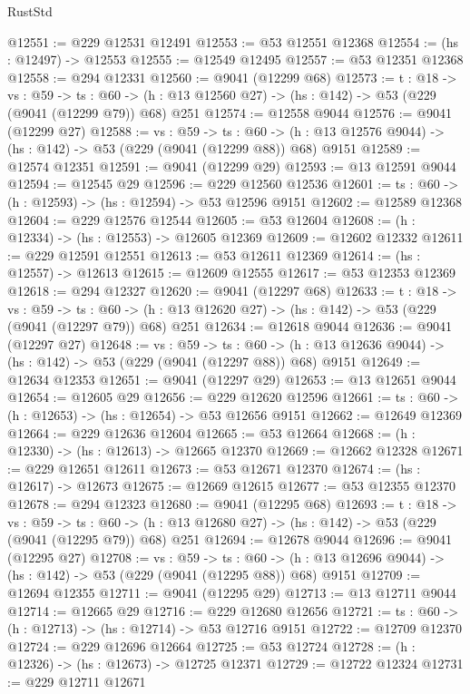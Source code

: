 \begin{lexlean}{RustStd}
\begin{coremodule}
@12551 := @229 @12531 @12491
@12553 := @53 @12551 @12368
@12554 := (hs : @12497) -> @12553
@12555 := @12549 @12495
@12557 := @53 @12351 @12368
@12558 := @294 @12331
@12560 := @9041 (@12299 @68)
@12573 := {t : @18} ->
  {vs : @59} ->
  {ts : @60} -> (h : @13 @12560 @27) -> (hs : @142) -> @53 (@229 (@9041 (@12299 @79)) @68) @251
@12574 := @12558 @9044
@12576 := @9041 (@12299 @27)
@12588 := {vs : @59} ->
  {ts : @60} -> (h : @13 @12576 @9044) -> (hs : @142) -> @53 (@229 (@9041 (@12299 @88)) @68) @9151
@12589 := @12574 @12351
@12591 := @9041 (@12299 @29)
@12593 := @13 @12591 @9044
@12594 := @12545 @29
@12596 := @229 @12560 @12536
@12601 := {ts : @60} -> (h : @12593) -> (hs : @12594) -> @53 @12596 @9151
@12602 := @12589 @12368
@12604 := @229 @12576 @12544
@12605 := @53 @12604
@12608 := (h : @12334) -> (hs : @12553) -> @12605 @12369
@12609 := @12602 @12332
@12611 := @229 @12591 @12551
@12613 := @53 @12611 @12369
@12614 := (hs : @12557) -> @12613
@12615 := @12609 @12555
@12617 := @53 @12353 @12369
@12618 := @294 @12327
@12620 := @9041 (@12297 @68)
@12633 := {t : @18} ->
  {vs : @59} ->
  {ts : @60} -> (h : @13 @12620 @27) -> (hs : @142) -> @53 (@229 (@9041 (@12297 @79)) @68) @251
@12634 := @12618 @9044
@12636 := @9041 (@12297 @27)
@12648 := {vs : @59} ->
  {ts : @60} -> (h : @13 @12636 @9044) -> (hs : @142) -> @53 (@229 (@9041 (@12297 @88)) @68) @9151
@12649 := @12634 @12353
@12651 := @9041 (@12297 @29)
@12653 := @13 @12651 @9044
@12654 := @12605 @29
@12656 := @229 @12620 @12596
@12661 := {ts : @60} -> (h : @12653) -> (hs : @12654) -> @53 @12656 @9151
@12662 := @12649 @12369
@12664 := @229 @12636 @12604
@12665 := @53 @12664
@12668 := (h : @12330) -> (hs : @12613) -> @12665 @12370
@12669 := @12662 @12328
@12671 := @229 @12651 @12611
@12673 := @53 @12671 @12370
@12674 := (hs : @12617) -> @12673
@12675 := @12669 @12615
@12677 := @53 @12355 @12370
@12678 := @294 @12323
@12680 := @9041 (@12295 @68)
@12693 := {t : @18} ->
  {vs : @59} ->
  {ts : @60} -> (h : @13 @12680 @27) -> (hs : @142) -> @53 (@229 (@9041 (@12295 @79)) @68) @251
@12694 := @12678 @9044
@12696 := @9041 (@12295 @27)
@12708 := {vs : @59} ->
  {ts : @60} -> (h : @13 @12696 @9044) -> (hs : @142) -> @53 (@229 (@9041 (@12295 @88)) @68) @9151
@12709 := @12694 @12355
@12711 := @9041 (@12295 @29)
@12713 := @13 @12711 @9044
@12714 := @12665 @29
@12716 := @229 @12680 @12656
@12721 := {ts : @60} -> (h : @12713) -> (hs : @12714) -> @53 @12716 @9151
@12722 := @12709 @12370
@12724 := @229 @12696 @12664
@12725 := @53 @12724
@12728 := (h : @12326) -> (hs : @12673) -> @12725 @12371
@12729 := @12722 @12324
@12731 := @229 @12711 @12671

\end{coremodule}
\end{lexlean}
